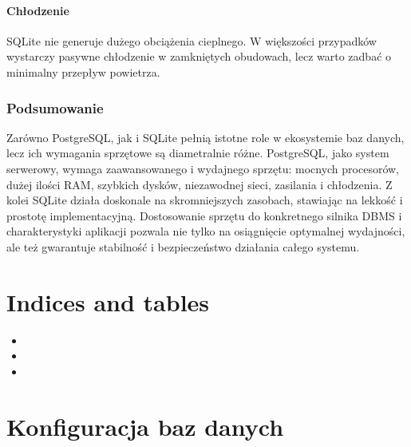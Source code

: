 \documentclass[letterpaper,10pt,polish]{sphinxmanual}
\begin{document}
\paragraph{Chłodzenie}
\label{\detokenize{rozdzial2/Sprzet-dla-bazy-danych/source/SprzetDlaBazyDanych:id6}}
\sphinxAtStartPar
SQLite nie generuje dużego obciążenia cieplnego. W większości przypadków wystarczy pasywne chłodzenie w zamkniętych obudowach, lecz warto zadbać o minimalny przepływ powietrza.


\subsubsection{Podsumowanie}
\label{\detokenize{rozdzial2/Sprzet-dla-bazy-danych/source/SprzetDlaBazyDanych:podsumowanie}}
\sphinxAtStartPar
Zarówno PostgreSQL, jak i SQLite pełnią istotne role w ekosystemie baz danych, lecz ich wymagania sprzętowe są diametralnie różne. PostgreSQL, jako system serwerowy, wymaga zaawansowanego i wydajnego sprzętu: mocnych procesorów, dużej ilości RAM, szybkich dysków, niezawodnej sieci, zasilania i chłodzenia.
Z kolei SQLite działa doskonale na skromniejszych zasobach, stawiając na lekkość i prostotę implementacyjną.
Dostosowanie sprzętu do konkretnego silnika DBMS i charakterystyki aplikacji pozwala nie tylko na osiągnięcie optymalnej wydajności, ale też gwarantuje stabilność i bezpieczeństwo działania całego systemu.


\section{Indices and tables}
\label{\detokenize{rozdzial2/Sprzet-dla-bazy-danych/source/index:indices-and-tables}}\begin{itemize}
\item {} 
\sphinxAtStartPar
{}

\item {} 
\sphinxAtStartPar
{}

\item {} 
\sphinxAtStartPar
{}

\end{itemize}

\sphinxstepscope


\section{Konfiguracja baz danych}
\label{\detokenize{rozdzial2/Konfiguracja_baz_danych/index:konfiguracja-baz-danych}}\label{\detokenize{rozdzial2/Konfiguracja_baz_danych/index::doc}}
\sphinxstepscope
\end{document}
